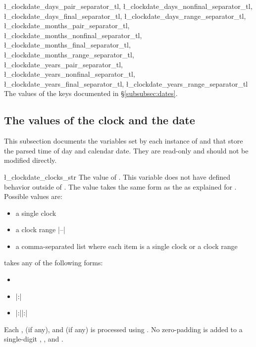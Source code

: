 \documentclass{beerydoc}
\begin{document}
\begin{codedoc}
  {
    \l_clockdate_days_pair_separator_tl,
    \l_clockdate_days_nonfinal_separator_tl,
    \l_clockdate_days_final_separator_tl,
    \l_clockdate_days_range_separator_tl,
    \l_clockdate_months_pair_separator_tl,
    \l_clockdate_months_nonfinal_separator_tl,
    \l_clockdate_months_final_separator_tl,
    \l_clockdate_months_range_separator_tl,
    \l_clockdate_years_pair_separator_tl,
    \l_clockdate_years_nonfinal_separator_tl,
    \l_clockdate_years_final_separator_tl,
    \l_clockdate_years_range_separator_tl
  }
  The values of the keys documented in \S\ref{subsubsec:dates}.
\end{codedoc}

\subsection{The values of the clock and the date}
\label{subsec:varclockdate}

This subsection documents the variables set by each instance of  and
 that store the parsed time of day and calendar date.
They are read-only and should not be modified directly.

\begin{codedoc}{\l_clockdate_clocks_str}
  The value of .
  This variable does not have defined behavior outside of .
  The value takes the same form as the  as explained for
  .
  Possible values are:
  \begin{itemize}
    \item a single clock 
    \item a clock range |--|
    \item
    a comma-separated list where each item is a single clock or a clock range
  \end{itemize}

   takes any of the following forms:
  \begin{itemize}
    \item {}
    \item {}|:|
    \item {}|:||:|
  \end{itemize}

  Each ,  (if any), and  (if any) is
  processed using .
  No zero-padding is added to a single-digit , , and
  .
\end{codedoc}
\end{document}
